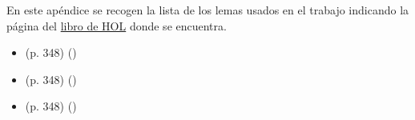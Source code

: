 %
\begin{isabellebody}%
%
%
\isadelimtheory
%
\endisadelimtheory
%
\isatagtheory
%
\endisatagtheory
{\isafoldtheory}%
%
\isadelimtheory
%
\endisadelimtheory
%
\begin{isamarkuptext}%
En este apéndice se recogen la lista de los lemas usados en
  el trabajo indicando la página del
  \href{http://bit.ly/2OMbjMM}{libro de HOL} donde se encuentra.%
\end{isamarkuptext}\isamarkuptrue%
%
\begin{isamarkuptext}%
%
\end{isamarkuptext}\isamarkuptrue%
%
\begin{isamarkuptext}%
%
\end{isamarkuptext}\isamarkuptrue%
%
\isadelimdocument
%
\endisadelimdocument
%
\isatagdocument
%
\isamarkuptrue%
%
\isamarkuptrue%
%
\endisatagdocument
{\isafolddocument}%
%
\isadelimdocument
%
\endisadelimdocument
%
\begin{isamarkuptext}%
\begin{itemize}
  \item (p. 348) 
    \hfill () 
  \item (p. 348) 
    \hfill () 
  \item (p. 348) 
    \hfill () 
\end{itemize}%
\end{isamarkuptext}\isamarkuptrue%
%
\isadelimtheory
%
\endisadelimtheory
%
\isatagtheory
%
\endisatagtheory
{\isafoldtheory}%
%
\isadelimtheory
%
\endisadelimtheory
%
\end{isabellebody}%
\endinput
